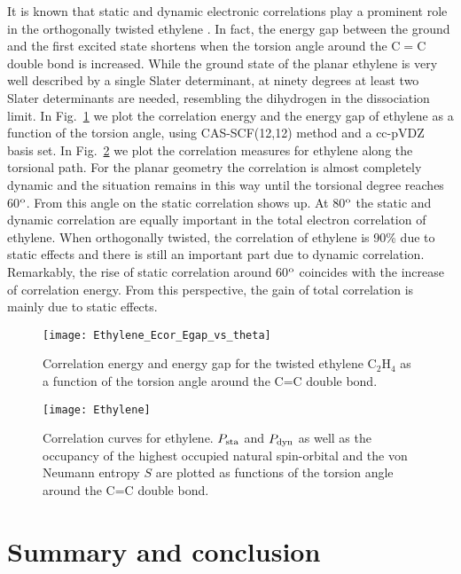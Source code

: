 \documentclass[aps,twocolumn,showpacs,pra,superscriptaddress,floatfix,longbibliography]{revtex4-1}
\newcommand{\7}{\dagger}
\begin{document}
It is known that static and dynamic electronic correlations play
a prominent role in the orthogonally twisted ethylene \cite{Zen}. 
In fact, the energy gap between the ground and the first excited 
state shortens when the torsion angle around the C$=$C double 
bond is increased. While the ground state of the planar 
ethylene is very well described by a single Slater determinant,
at ninety degrees at least two Slater determinants 
are needed, resembling the dihydrogen in the dissociation limit. 
In Fig.~\ref{graf:ethyleneenergy} we plot the correlation energy 
and the energy gap of ethylene as a function of the
torsion angle, using CAS-SCF(12,12) method and a 
cc-pVDZ basis set. 
  In Fig.~\ref{graf:ethyl} we plot the correlation measures
  for ethylene along the torsional path. 
  For the planar geometry the correlation is almost completely
  dynamic and the situation remains in this way until the 
  torsional degree reaches 60$^{\rm o}$. From this angle on the 
  static correlation shows up. At  80$^{\rm o}$ the static and 
  dynamic correlation are equally important in the total 
  electron correlation of ethylene. When orthogonally twisted,
  the correlation of ethylene is 90\% due to static effects and 
  there is still an important part due to dynamic correlation. 
  Remarkably, the rise of static correlation around 60$^{\rm o}$
  coincides with the increase of correlation energy. From this 
  perspective, the gain of total correlation is mainly due to static 
  effects. 
  
 \begin{figure}[!t] 
 \centering
\texttt{[image: Ethylene\_Ecor\_Egap\_vs\_theta]}
\caption{Correlation energy and energy gap for the twisted 
ethylene C$_2$H$_4$ as a function of the torsion angle 
around the C=C double bond.}
 \label{graf:ethyleneenergy}
 \end{figure}

 
 \begin{figure}[!t] 
 \centering
\texttt{[image: Ethylene]}
\caption{Correlation curves for
ethylene. $P_{\rm sta}$ and $P_{\rm dyn}$ as
  well as the occupancy of the highest occupied natural 
  spin-orbital and the von Neumann entropy $S$ are 
  plotted as functions of  the torsion angle
  around the C=C double bond.}
 \label{graf:ethyl}
 \end{figure}
  
\section{Summary and conclusion}
\end{document}
